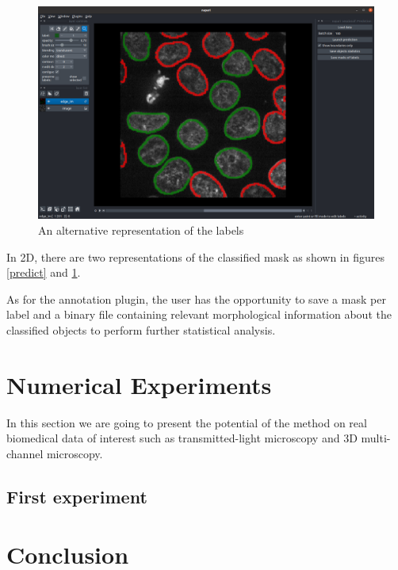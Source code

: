 \documentclass{article}
\begin{document}
\begin{figure}[h!]{}
 \centering
 \includegraphics[scale=0.15]{Figures/predict_contours.png}
  \caption{An alternative representation of the labels}
  \label{predict_contours}

\end{figure}

In 2D, there are two representations of the classified mask as shown in figures \ref{predict} and \ref{predict_contours}.

As for the annotation plugin, the user has the opportunity to save a mask per label and a binary file containing relevant morphological information about the classified objects to perform further statistical analysis.


\section{Numerical Experiments}
\label{sec:experiments}

In this section we are going to present the potential of the method on real biomedical data of interest such as transmitted-light microscopy and 3D multi-channel microscopy.

\subsection{First experiment}


\section{Conclusion}
\label{sec:conclusion}




\vfill
\pagebreak




\end{document}
